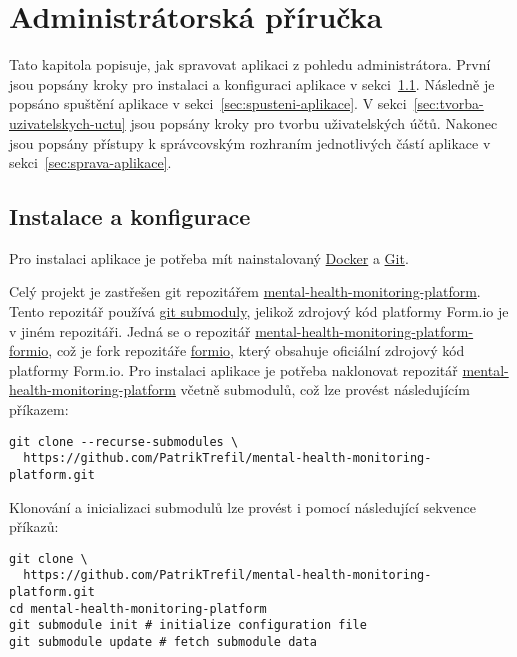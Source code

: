 \chapter{Administrátorská příručka}\label{ch:administratorska-prirucka}

Tato kapitola popisuje, jak spravovat aplikaci z pohledu administrátora.
První jsou popsány kroky pro instalaci a konfiguraci aplikace v sekci~\ref{sec:instalace}.
Následně je popsáno spuštění aplikace v sekci~\ref{sec:spusteni-aplikace}.
V sekci~\ref{sec:tvorba-uzivatelskych-uctu} jsou popsány kroky pro tvorbu uživatelských účtů.
Nakonec jsou popsány přístupy k správcovským rozhraním jednotlivých částí aplikace v sekci~\ref{sec:sprava-aplikace}.


\section{Instalace a konfigurace}\label{sec:instalace}

Pro instalaci aplikace je potřeba mít nainstalovaný \href{https://www.docker.com/}{Docker} a \href{https://git-scm.com/}{Git}.

Celý projekt je zastřešen git repozitářem \href{https://github.com/PatrikTrefil/mental-health-monitoring-platform.git}{mental-health-monitoring-platform}.
Tento repozitář používá \href{https://git-scm.com/book/en/v2/Git-Tools-Submodules}{git submoduly}, jelikož zdrojový kód platformy Form.io je v jiném repozitáři.
Jedná se o repozitář \href{https://github.com/PatrikTrefil/mental-health-monitoring-platform-formio}{mental-health-monitoring-platform-formio}, což je fork repozitáře \href{https://github.com/formio/formio}{formio}, který obsahuje oficiální zdrojový kód platformy Form.io.
Pro instalaci aplikace je potřeba naklonovat repozitář \href{https://github.com/PatrikTrefil/mental-health-monitoring-platform.git}{mental-health-monitoring-platform} včetně submodulů, což lze provést následujícím příkazem:

\begin{verbatim}
git clone --recurse-submodules \
  https://github.com/PatrikTrefil/mental-health-monitoring-platform.git
\end{verbatim}

Klonování a inicializaci submodulů lze provést i pomocí následující sekvence příkazů:

\begin{verbatim}
git clone \
  https://github.com/PatrikTrefil/mental-health-monitoring-platform.git
cd mental-health-monitoring-platform
git submodule init # initialize configuration file
git submodule update # fetch submodule data
\end{verbatim}

